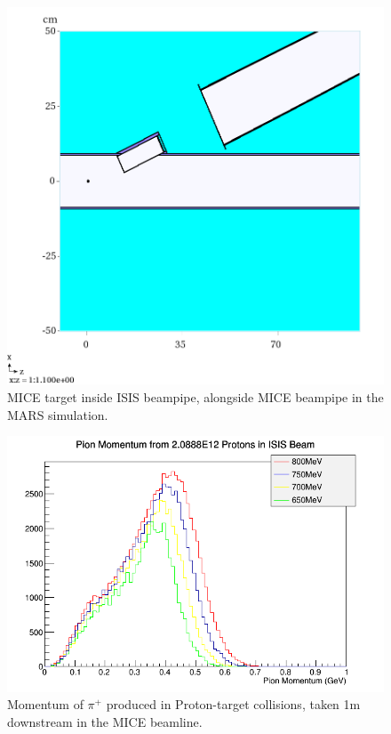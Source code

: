 \documentclass[a4paper,11pt]{article}
\begin{document}
\begin{figure}[t!]
  \begin{center}
    \includegraphics[width=1.0\columnwidth]{./figures/XZGeom-v6-Q1-y=6cm.png}
    \caption{MICE target inside ISIS beampipe, alongside MICE beampipe in the MARS simulation. }
    \label{fig:MARSXZ}
  \end{center}
\end{figure}

\begin{figure}[t!]
  \begin{center}
    \includegraphics[width=1.0\columnwidth]{./figures/PiMomentumNew.png}
    \caption{Momentum of $\pi^{+}$ produced in Proton-target collisions, taken 1m downstream in the MICE beamline.}
    \label{fig:PiMomentum}
  \end{center}
\end{figure}
\end{document}
